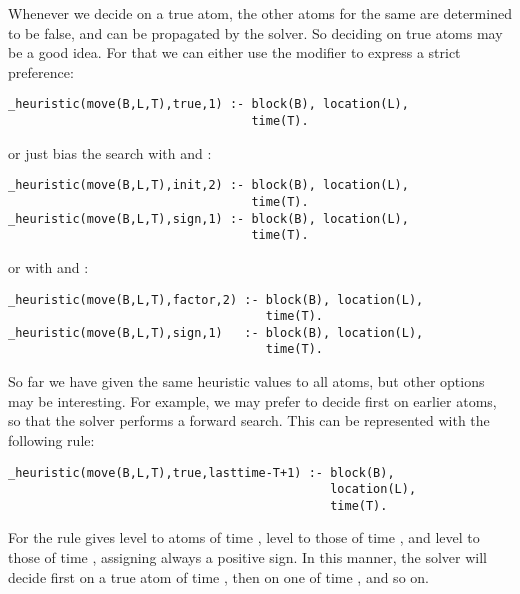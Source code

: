 Whenever we decide on a true  atom,  
the other  atoms for the same  are determined to be false,
and can be propagated by the solver. 
So deciding on true  atoms may be a good idea.
For that we can either use the  modifier to express a strict preference:
\begin{lstlisting}[basicstyle=\small\ttfamily,numbers=none]
_heuristic(move(B,L,T),true,1) :- block(B), location(L), 
                                  time(T).
\end{lstlisting}
or just bias the search with  and :
\begin{lstlisting}[basicstyle=\small\ttfamily,numbers=none]
_heuristic(move(B,L,T),init,2) :- block(B), location(L), 
                                  time(T).
_heuristic(move(B,L,T),sign,1) :- block(B), location(L), 
                                  time(T).
\end{lstlisting}
or with  and :
\begin{lstlisting}[basicstyle=\small\ttfamily,numbers=none]
_heuristic(move(B,L,T),factor,2) :- block(B), location(L), 
                                    time(T).
_heuristic(move(B,L,T),sign,1)   :- block(B), location(L), 
                                    time(T).
\end{lstlisting}

So far we have given the same heuristic values to all  atoms,
but other options may be interesting. 
For example, we may prefer to decide first on earlier  atoms,
so that the solver performs a forward search. 
This can be represented with the following rule:
\begin{lstlisting}[basicstyle=\small\ttfamily,numbers=none]
_heuristic(move(B,L,T),true,lasttime-T+1) :- block(B),                                             
                                             location(L),
                                             time(T).
\end{lstlisting}
For  the rule gives level  to  atoms of time ,
level  to those of time , and level  to those of time ,
assigning always a positive sign.  
In this manner, 
the solver will decide first on a true  atom of time , 
then on one of time , and so on.

